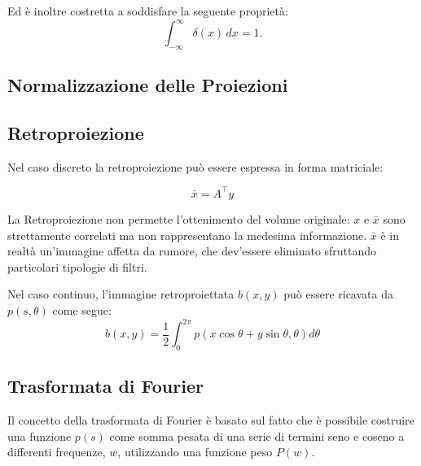\documentclass[a4paper,12pt, doubleside]{report}
\begin{document}
                    Ed è inoltre costretta a soddisfare la seguente proprietà:
                    \begin{equation}
                        \int_{-\infty}^\infty \delta(x) \, dx = 1.
                    \end{equation}
            
            \subsection{Normalizzazione delle Proiezioni}
                
            
            \subsection{Retroproiezione}
                \par
                    Nel caso discreto la retroproiezione può essere espressa in forma matriciale:
                    
                    \begin{equation}
                        \bar{x} = A^\top y
                    \end{equation}
                    
                    La Retroproiezione non permette l'ottenimento del volume originale: $x$ e $\bar{x}$ sono strettamente correlati ma non rappresentano la medesima informazione. $\bar{x}$ è in realtà un'immagine affetta da rumore, che dev'essere eliminato sfruttando particolari tipologie di filtri.
                
                \bigskip
                \par
                    Nel caso continuo, l'immagine retroproiettata $b(x,y)$ può essere ricavata da $p(s,\theta)$ come segue:
                    \begin{equation}
                        b(x,y) = \frac{1}{2} \int_{0}^{2\pi} p(x \cos \theta + y \sin \theta , \theta ) d\theta
                    \end{equation}
                
                \bigskip
                               
            \subsection{Trasformata di Fourier}
                \par
                    Il concetto della trasformata di Fourier è basato sul fatto che è possibile costruire una funzione $p(s)$ come somma pesata di una serie di termini seno e coseno a differenti frequenze, $w$, utilizzando una funzione peso $P(w)$.
                
\end{document}
